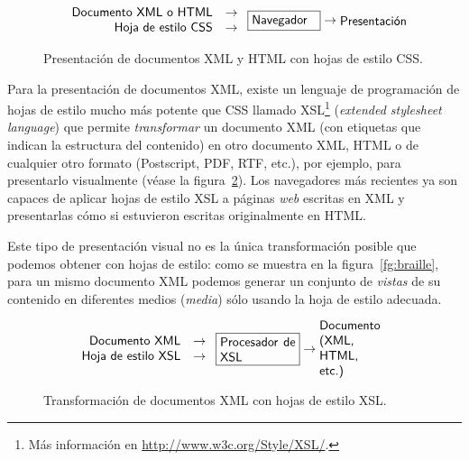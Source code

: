 \begin{figure} $$ \left. \begin{array}{rcl} \mbox{\textsf{Documento XML o HTML}} &\to \\ \mbox{\textsf{Hoja de estilo CSS}} &\to \\ \end{array} \right. \mbox{\framebox{\parbox{1.8cm}{\textsf{Navegador}}}} \to \mbox{\parbox{1.8cm}{\textsf{Presentación}}} $$ \caption{Presentación de documentos XML y HTML con hojas de estilo CSS.} \label{fg:CSS} \end{figure} 

Para la presentación de documentos XML, existe un lenguaje de programación de hojas de estilo mucho más potente que CSS llamado XSL\footnote{Más información en \url{http://www.w3c.org/Style/XSL/}.} (\emph{extended stylesheet language}) que permite \emph{transformar} un documento XML (con etiquetas que  indican la estructura del contenido) en otro documento XML, HTML o de cualquier otro formato (Postscript, PDF, RTF, etc.), por ejemplo, para presentarlo visualmente (véase la figura~\ref{fg:XSL}). Los navegadores más recientes ya son capaces de aplicar hojas de estilo XSL a páginas \emph{web} escritas en XML y presentarlas cómo si estuvieron escritas originalmente en HTML. 

Este tipo de presentación visual no es la única transformación posible que podemos obtener con hojas de estilo: como se muestra en la figura~\ref{fg:braille}, para un mismo documento XML podemos generar un conjunto de \emph{vistas} de su contenido en diferentes medios (\emph{media}) sólo usando la hoja de estilo adecuada. 

\begin{figure} $$ \left. \begin{array}{rcl} \mbox{\textsf{Documento XML}} &\to \\ \mbox{\textsf{Hoja de estilo XSL}} &\to \\ \end{array} \right. \mbox{\framebox{\parbox{2.1cm}{\textsf{Procesador de XSL}}}} \to \mbox{\parbox{2.1cm}{\textsf{Documento (XML, HTML, etc.) }}} $$ \caption{Transformación de documentos XML con hojas de estilo XSL.} \label{fg:XSL} \end{figure} 

